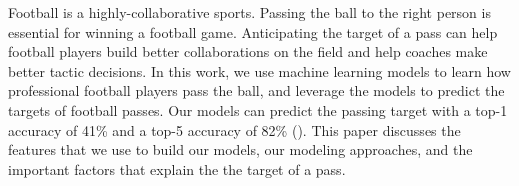 Football is a highly-collaborative sports. 
Passing the ball to the right person is essential for winning a football game.
Anticipating the target of a pass can help football players build better collaborations on the field and help coaches make better tactic decisions.
In this work, we use machine learning models to learn how professional football players pass the ball, and leverage the models to predict the targets of football passes.
Our models can predict the passing target with a top-1 accuracy of 41\% and a top-5 accuracy of 82\% ().
This paper discusses the features that we use to build our models, our modeling approaches, and the important factors that explain the the target of a pass.
